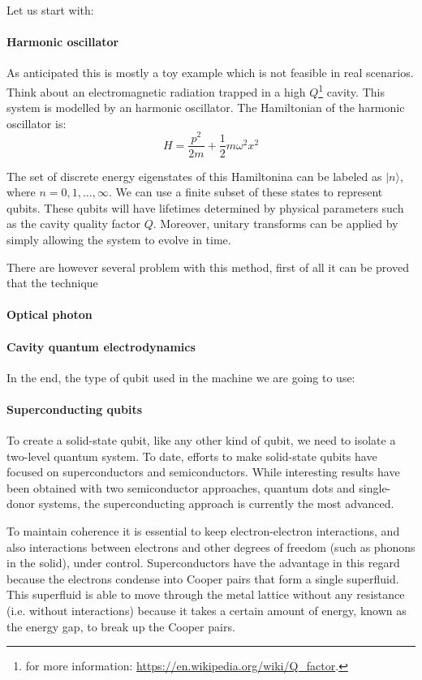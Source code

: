 Let us start with:
\paragraph{Harmonic oscillator}
As anticipated this is mostly a toy example which is not feasible in real scenarios. 
Think about an electromagnetic radiation trapped in a high $Q$\footnote{for more information: \url{https://en.wikipedia.org/wiki/Q_factor}.} cavity. This system is modelled by an harmonic oscillator. The Hamiltonian of the harmonic oscillator is:
\begin{equation}
    H=\frac{p^{2}}{2 m}+\frac{1}{2} m \omega^{2} x^{2}
\end{equation}

The set of discrete energy eigenstates of this Hamiltonina can be labeled as $|n\rangle$, where $n=0,1, \ldots, \infty$. We can use a finite subset of these states to represent qubits. These qubits will have lifetimes determined by physical parameters such as the cavity quality factor $Q$. Moreover, unitary transforms can be applied by simply allowing the system to evolve in time. 
 
There are however several problem with this method, first of all it can be proved that the technique 
\paragraph{Optical photon}
\paragraph{Cavity quantum electrodynamics}

In the end, the type of qubit used in the machine we are going to use:
\paragraph{Superconducting qubits}
To create a solid-state qubit, like any other kind of qubit, we need to isolate a two-level quantum system. To date, efforts to make solid-state qubits have focused on superconductors and semiconductors. While interesting results have been obtained with two semiconductor approaches, quantum dots and single-donor systems, the superconducting approach is currently the most advanced.

To maintain coherence it is essential to keep electron-electron interactions, and also interactions between electrons and other degrees of freedom (such as phonons in the solid), under control. Superconductors have the advantage in this regard because the electrons condense into Cooper pairs that form a single superfluid. This superfluid is able to move through the metal lattice without any resistance (i.e. without interactions) because it takes a certain amount of energy, known as the energy gap, to break up the Cooper pairs.


